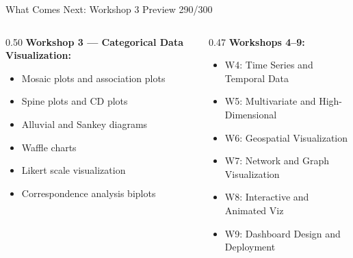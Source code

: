 \documentclass[10pt]{beamer}
\newcommand{\smark}[1]{\hfill{\scriptsize\color{codegray}#1}}
\begin{document}
\begin{frame}{What Comes Next: Workshop 3 Preview}
\smark{290/300}
\begin{columns}[T]
\begin{column}{0.50\textwidth}
    \textbf{Workshop 3 --- Categorical Data Visualization:}
    \begin{itemize}
        \item Mosaic plots and association plots
        \item Spine plots and CD plots
        \item Alluvial and Sankey diagrams
        \item Waffle charts
        \item Likert scale visualization
        \item Correspondence analysis biplots
    \end{itemize}
\end{column}
\begin{column}{0.47\textwidth}
    \textbf{Workshops 4--9:}
    \begin{itemize}
        \item W4: Time Series and Temporal Data
        \item W5: Multivariate and High-Dimensional
        \item W6: Geospatial Visualization
        \item W7: Network and Graph Visualization
        \item W8: Interactive and Animated Viz
        \item W9: Dashboard Design and Deployment
    \end{itemize}
\end{column}
\end{columns}
\end{frame}
\end{document}
